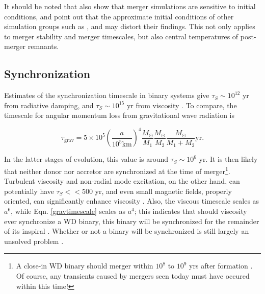 It should be noted that \cite{dan+11} also show that merger simulations are sensitive to initial conditions, and point out that the approximate initial conditions of other simulation groups such as \citeauthor{loreig09}, \citeauthor{guerig04} and \cite{pakm+10} may distort their findings.  This not only applies to merger stability and merger timescales, but also central temperatures of post-merger remnants.

\subsection{Synchronization}
\label{ssec:synchronization}

Estimates of the synchronization timescale in binary systems give $\tau_{S} \sim 10^{12}$ yr from radiative damping, and $\tau_{S} \sim 10^{15}$ yr from viscosity \citep{marsns04}.  To compare, the timescale for angular momentum loss from gravitational wave radiation is \citep{segrcm97}

\begin{equation}
\tau_{\mathrm{grav}} = 5 \times 10^5 \left( \frac{a}{10^5 \mathrm{km}}\right)^4 \frac{M_{\odot}}{M_1} \frac{M_{\odot}}{M_2} \frac{M_{\odot}}{M_1 + M_2} \mathrm{ yr}.
\label{gravtimescale}
\end{equation}

\noindent In the latter stages of evolution, this value is around $\tau_{S} \sim 10^{6}$ yr.  It is then likely that neither donor nor accretor are synchronized at the time of merger\footnote{A close-in WD binary should merger within $10^8$ to $10^9$ yrs after formation \cite{segrcm97}.  Of course, any transients caused by mergers seen today must have occured within this time!}.  Turbulent viscosity and non-radial mode excitation, on the other hand, can potentially have $\tau_{S} << 500$ yr, and even small magnetic fields, properly oriented, can significantly enhance viscosity \citep{marsns04,ibentf98}.  Also, the viscous timescale scales as $a^6$, while Eqn. \ref{gravtimescale} scales as $a^4$; this indicates that should viscosity ever synchronize a WD binary, this binary will be synchronized for the remainder of its inspiral \citep{ibentf98}.  Whether or not a binary will be synchronized is still largely an unsolved problem \citep{mars11}.

